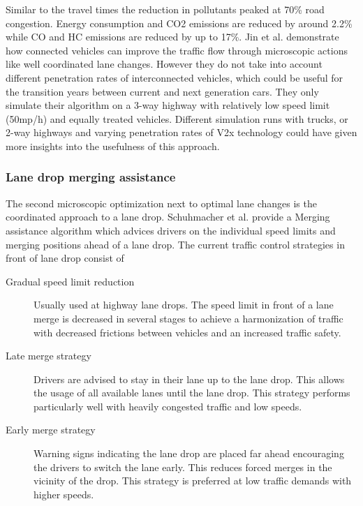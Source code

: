 \documentclass{sig-alternate}
\begin{document}
Similar to the travel times the reduction in pollutants peaked at 70\% road congestion. Energy consumption and CO2 emissions are reduced by around 2.2\% while CO and HC emissions are reduced by up to 17\%. Jin et al. demonstrate how connected vehicles can improve the traffic flow through microscopic actions like well coordinated lane changes. However they do not take into account different penetration rates of interconnected vehicles, which could be useful for the transition years between current and next generation cars. They only simulate their algorithm on a 3-way highway with relatively low speed limit (50mp/h) and equally treated vehicles. Different simulation runs with trucks, or 2-way highways and  varying penetration rates of V2x technology could have given more insights into the usefulness of this approach. 
\subsubsection{Lane drop merging assistance}
The second microscopic optimization next to optimal lane changes is the coordinated approach to a lane drop. Schuhmacher et al.\cite{1614269.1614274} provide a Merging assistance algorithm which advices drivers on the individual speed limits and merging positions ahead of a lane drop. The current traffic control strategies in front of lane drop consist of
\begin{description}
\item[Gradual speed limit reduction] Usually used at highway lane drops. The speed limit in front of a lane merge is decreased in several stages to achieve a harmonization of traffic with decreased frictions between vehicles and an increased traffic safety.
\item[Late merge strategy] Drivers are advised to stay in their lane up to the lane drop. This allows the usage of all available lanes until the lane drop. This strategy performs particularly well with heavily congested traffic and low speeds. 
\item [Early merge strategy] Warning signs indicating the lane drop are placed far ahead encouraging the drivers to switch the lane early. This reduces forced merges in the vicinity of the drop. This strategy is preferred at low traffic demands with higher speeds.  
\end{description} 
\end{document}

